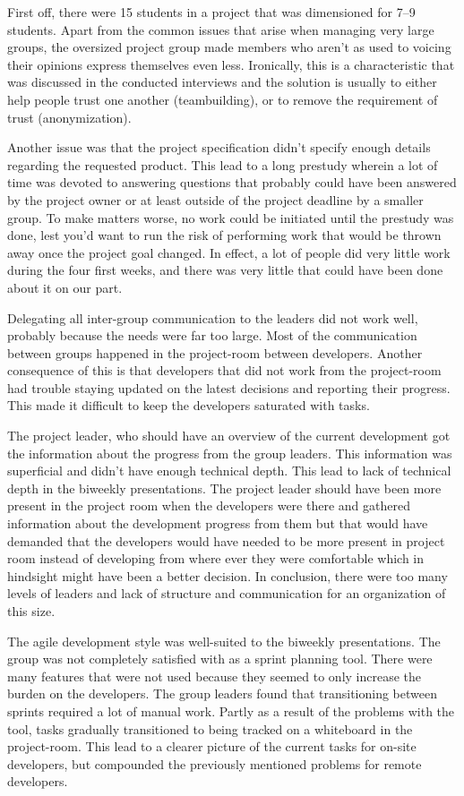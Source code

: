 First off, there were 15 students in a project that was dimensioned for 7--9 students. Apart from the common issues that arise when managing very large groups, the oversized project group made members who aren't as used to voicing their opinions express themselves even less. Ironically, this is a characteristic that was discussed in the conducted interviews and the solution is usually to either help people trust one another (teambuilding), or to remove the requirement of trust (anonymization). 

Another issue was that the project specification didn't specify enough details regarding the requested product. This lead to a long prestudy wherein a lot of time was devoted to answering questions that probably could have been answered by the project owner or at least outside of the project deadline by a smaller group. To make matters worse, no work could be initiated until the prestudy was done, lest you'd want to run the risk of performing work that would be thrown away once the project goal changed. In effect, a lot of people did very little work during the four first weeks, and there was very little that could have been done about it on our part.

Delegating all inter-group communication to the leaders did not work well, probably because the needs were far too large. Most of the communication between groups happened in the project-room between developers. Another consequence of this is that developers that did not work from the project-room had trouble staying updated on the latest decisions and reporting their progress. This made it difficult to keep the developers saturated with tasks.

The project leader, who should have an overview of the current development got the information about the progress from the group leaders. This information was superficial and didn't have enough technical depth. This lead to lack of technical depth in the biweekly presentations. The project leader should have been more present in the project room when the developers were there and gathered information about the development progress from them but that would have demanded that the developers would have needed to be more present in project room instead of developing from where ever they were comfortable which in hindsight might have been a better decision. In conclusion, there were too many levels of leaders and lack of structure and communication for an organization of this size.

The agile development style was well-suited to the biweekly presentations. The group was not completely satisfied with \taiga{} as a sprint planning tool. There were many features that were not used because they seemed to only increase the burden on the developers. The group leaders found that transitioning between sprints required a lot of manual work. Partly as a result of the problems with the tool, tasks gradually transitioned to being tracked on a whiteboard in the project-room. This lead to a clearer picture of the current tasks for on-site developers, but compounded the previously mentioned problems for remote developers.
